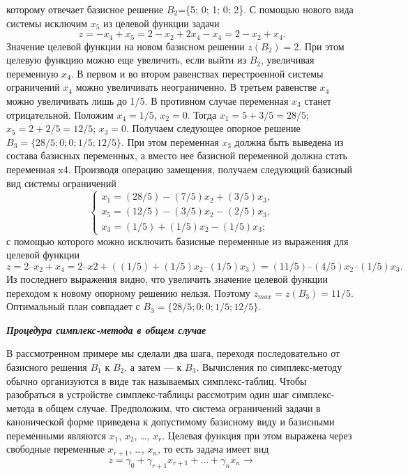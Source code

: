 которому отвечает базисное решение $B_2$=\{5; 0; 1; 0; 2\}. С помощью нового вида системы исключим $x_5$ из целевой функции задачи
$$z = -x_4 + x_5 = 2 - x_2 + 2x_4 - x_4 = 2 - x_2 + x_4.$$
Значение целевой функции на новом базисном решении $z(B_2) = 2$. При этом целевую функцию можно еще увеличить, если выйти из $B_2$, увеличивая переменную $x_4$. В первом и во втором равенствах перестроенной системы ограничений $x_4$ можно увеличивать неограниченно. В третьем равенстве $x_4$ можно увеличивать лишь до 1/5. В противном случае переменная $x_3$ станет отрицательной. Положим $x_4 = 1/5$, $x_2 = 0$. Тогда $x_1 = 5 + 3/5 = 28/5$; $x_5 = 2 + 2 / 5 = 12 / 5$; $x_3 = 0$. Получаем следующее опорное решение $B_3=\{28/5; 0; 0; 1/5; 12/5\}$. При этом переменная $x_3$ должна быть выведена из состава базисных переменных, а вместо нее базисной переменной должна стать переменная x4. Производя операцию замещения, получаем следующий базисный вид системы ограничений
\begin{equation*}
\begin{cases}
x_1 = (28/5) - (7/5)x_2 + (3/5)x_3,\\
x_5 = (12/5) - (3/5)x_2 - (2/5)x_3,\\
x_3 = (1/5) + (1/5)x_2 - (1/5)x_3;
\end{cases}
\end{equation*}
с помощью которого можно исключить базисные переменные из выражения для целевой функции
$$z = 2 – x_2 + x_4 = 2 – x2 + ((1/5) + (1/5)x_2 – (1/5)x_3) = (11/5) – (4/5)x_2 – (1/5)x_3.$$
Из последнего выражения видно, что увеличить значение целевой функции переходом к новому опорному решению нельзя. Поэтому $z_{max}= z(B_3) = 11/5$. Оптимальный план совпадает с $B_3 = \{28/5; 0; 0; 1/5; 12/5\}$.
\begin{center}
\textit{\textbf{Процедура симплекс-метода в общем случае}}
\end{center}

В рассмотренном примере мы сделали два шага, переходя последовательно от базисного решения $B_1$ к $B_2$, а затем — к $B_3$. Вычисления по симплекс-методу обычно организуются в виде так называемых симплекс-таблиц. Чтобы разобраться в устройстве симплекс-таблицы рассмотрим один шаг симплекс-метода в общем случае. Предположим, что система ограничений задачи в канонической форме приведена к допустимому базисному виду и базисными переменными являются $x_1$, $x_2$, \dots, $x_r$. Целевая функция при этом выражена через свободные переменные $x_{r+1}$, \dots, $x_n$, то есть задача имеет вид
$$z = \gamma_0 + \gamma_{r+1}x_{r+1} +\dots+\gamma_nx_n \rightarrow$$


